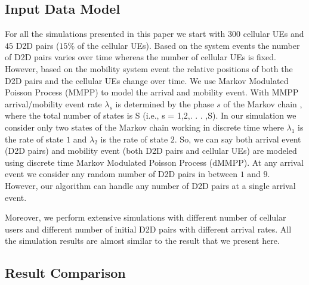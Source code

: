 \documentclass[times]{dacauth}
\begin{document}
\subsection{Input Data Model}

\noindent


\noindent
For all the simulations presented in this paper we start with $300$ cellular UEs and $45$ D2D pairs ($15\%$ of the cellular UEs). Based on the system events the number of D2D pairs varies over time whereas the number of cellular UEs is fixed. However, based on the mobility system event the relative positions of both the D2D pairs and the cellular UEs change over time. We use Markov Modulated Poisson Process (MMPP)\cite{salvador2003multiscale} to model the arrival and mobility event. With MMPP arrival/mobility event rate $\lambda_s$ is determined by the phase $s$ of the Markov chain \cite{stewart1994introduction}, where the total number of states is S (i.e., s = 1,2,. . . ,S). In our simulation we consider only two states of the Markov chain working in discrete time where $\lambda_1$ is the rate of state $1$ and $\lambda_2$ is the rate of state $2$. So, we can say both arrival event (D2D pairs) and mobility event (both D2D pairs and cellular UEs) are modeled using discrete time Markov Modulated Poisson Process (dMMPP). At any arrival event we consider any random number of D2D pairs in between $1$ and $9$. However, our algorithm can handle any number of D2D pairs at a single arrival event.


\noindent
Moreover, we perform extensive simulations with different number of cellular users and different number of initial D2D pairs with different arrival rates. All the simulation results are almost similar to the result that we present here.

\subsection{Result Comparison}
\end{document}
